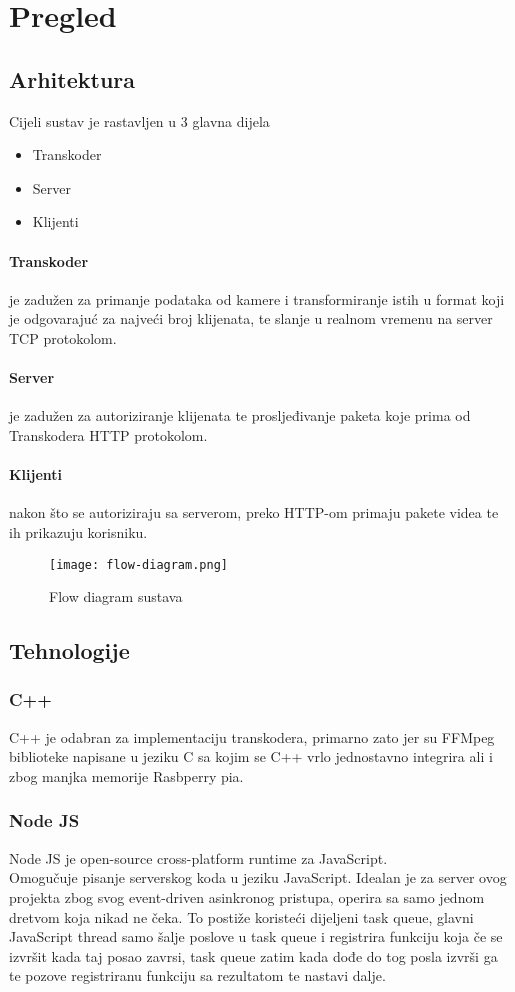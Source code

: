 \section{Pregled}

\subsection{Arhitektura}
Cijeli sustav je rastavljen u 3 glavna dijela
\begin{itemize}
  \item Transkoder
  \item Server
  \item Klijenti
\end{itemize}
\paragraph{Transkoder}
je zadužen za primanje podataka od kamere i transformiranje istih u format koji je odgovarajuć za najveći broj klijenata, 
te slanje u realnom vremenu na server TCP protokolom.
\paragraph{Server}
je zadužen za autoriziranje klijenata te prosljeđivanje paketa koje prima od Transkodera HTTP protokolom.
\paragraph{Klijenti}
nakon što se autoriziraju sa serverom, preko HTTP-om primaju pakete videa te ih prikazuju korisniku.
\begin{figure}[h]
  \centering
  \texttt{[image: flow-diagram.png]}
  \caption{Flow diagram sustava}
\end{figure}

\clearpage
\subsection{Tehnologije}

\subsubsection{C++}
C++ je odabran za implementaciju transkodera, primarno zato jer su FFMpeg biblioteke napisane u jeziku C sa kojim se C++ vrlo jednostavno integrira ali
i zbog manjka memorije Rasbperry pia.

\subsubsection{Node JS}
Node JS je open-source cross-platform runtime za JavaScript. \\
Omogučuje pisanje serverskog koda u jeziku JavaScript.
\paraBreak
Idealan je za server ovog projekta zbog svog event-driven asinkronog pristupa, operira sa samo jednom dretvom koja nikad ne čeka.
\paraBreak
To postiže koristeći dijeljeni task queue, glavni JavaScript thread samo šalje poslove u task queue i registrira funkciju koja če se izvršit kada taj posao zavrsi, 
task queue zatim kada dođe do tog posla izvrši ga te pozove registriranu funkciju sa rezultatom te nastavi dalje.

